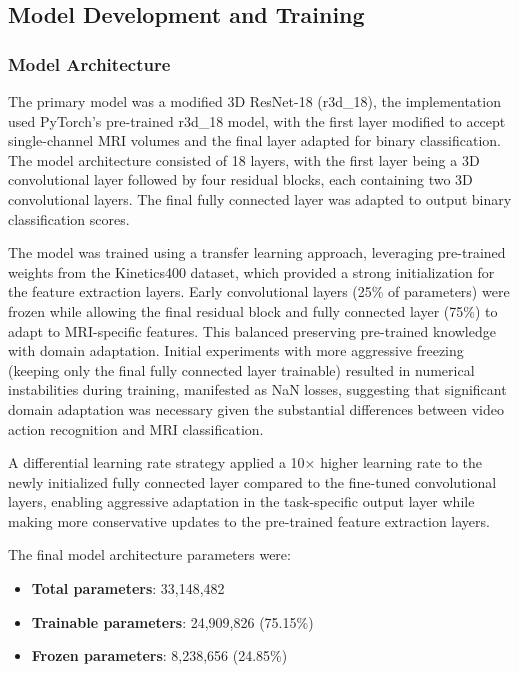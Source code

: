 \documentclass[11pt, a4paper]{article}
\begin{document}
\subsection{Model Development and Training}
\subsubsection{Model Architecture}

The primary model was a modified 3D ResNet-18 (r3d\_18), the implementation used PyTorch's pre-trained r3d\_18 model, with the first layer modified to accept single-channel MRI volumes and the final layer adapted for binary classification. The model architecture consisted of 18 layers, with the first layer being a 3D convolutional layer followed by four residual blocks, each containing two 3D convolutional layers. The final fully connected layer was adapted to output binary classification scores.

The model was trained using a transfer learning approach, leveraging pre-trained weights from the Kinetics400 dataset, which provided a strong initialization for the feature extraction layers. Early convolutional layers (25\% of parameters) were frozen while allowing the final residual block and fully connected layer (75\%) to adapt to MRI-specific features. This balanced preserving pre-trained knowledge with domain adaptation. Initial experiments with more aggressive freezing (keeping only the final fully connected layer trainable) resulted in numerical instabilities during training, manifested as NaN losses, suggesting that significant domain adaptation was necessary given the substantial differences between video action recognition and MRI classification.

A differential learning rate strategy applied a 10× higher learning rate to the newly initialized fully connected layer compared to the fine-tuned convolutional layers, enabling aggressive adaptation in the task-specific output layer while making more conservative updates to the pre-trained feature extraction layers.

The final model architecture parameters were:

\begin{itemize}
    \item \textbf{Total parameters}: 33,148,482
    \item \textbf{Trainable parameters}: 24,909,826 (75.15\%)
    \item \textbf{Frozen parameters}: 8,238,656 (24.85\%)
\end{itemize}
\end{document}
